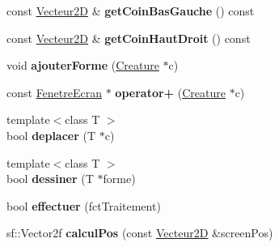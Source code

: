 \begin{DoxyCompactItemize}
const \mbox{\hyperlink{class_vecteur2_d}{Vecteur2D}} \& {\bfseries get\+Coin\+Bas\+Gauche} () const
\item 
\mbox{\label{class_fenetre_ecran_a3e19aa107adc34157e5220927232ca4c}} 
const \mbox{\hyperlink{class_vecteur2_d}{Vecteur2D}} \& {\bfseries get\+Coin\+Haut\+Droit} () const
\item 
\mbox{\label{class_fenetre_ecran_a5da18d223bb9a50ef9df2fbca39cbfba}} 
void {\bfseries ajouter\+Forme} (\mbox{\hyperlink{class_creature}{Creature}} $\ast$c)
\item 
\mbox{\label{class_fenetre_ecran_a3568497e80eda81ded15c6c8399d2626}} 
const \mbox{\hyperlink{class_fenetre_ecran}{Fenetre\+Ecran}} $\ast$ {\bfseries operator+} (\mbox{\hyperlink{class_creature}{Creature}} $\ast$c)
\item 
\mbox{\label{class_fenetre_ecran_a90ed854e37772b0fe9b4db9d2c59d58c}} 
{\footnotesize template$<$class T $>$ }\\bool {\bfseries deplacer} (T $\ast$c)
\item 
\mbox{\label{class_fenetre_ecran_aee95fb01be15ad8071743df414ac2f11}} 
{\footnotesize template$<$class T $>$ }\\bool {\bfseries dessiner} (T $\ast$forme)
\item 
\mbox{\label{class_fenetre_ecran_a254a7e51115405bc9c3d573fdd6fe5a9}} 
bool {\bfseries effectuer} (fct\+Traitement)
\item 
\mbox{\label{class_fenetre_ecran_a2f4344b4bc71982db1c192ee45548aa1}} 
sf\+::\+Vector2f {\bfseries calcul\+Pos} (const \mbox{\hyperlink{class_vecteur2_d}{Vecteur2D}} \&screen\+Pos)
\end{DoxyCompactItemize}
